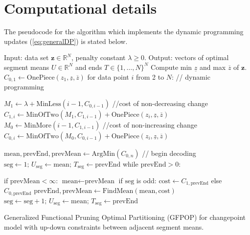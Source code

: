 \documentclass[article]{jss}
\newcommand{\RR}{\mathbb R}
\begin{document}

\section*{Computational details}

The pseudocode for the algorithm which implements the dynamic
programming updates (\ref{eq:generalDP}) is stated below.

\begin{algorithm}
\begin{algorithmic}[1]
\STATE Input: data set $\mathbf z\in\RR^N$, penalty constant $\lambda\geq 0$.
\STATE Output: vectors of optimal segment means $U\in\RR^{N}$ and ends $T\in\{1,\dots,N\}^{N}$
\STATE Compute min $\underline z$ and max $\overline z$ of $\mathbf z$.
\label{line:op-min-max}
\STATE
$ C_{0,1}\gets
 \text{OnePiece}(z_1, \underline z, \overline z)$
\STATE for data point $i$ from 2 to $N$: // dynamic programming
\label{line:for-dp-t}
\begin{ALC@g}
  \STATE $ M_1\gets \lambda + \text{MinLess}(i-1,  C_{0,i-1})$ //cost of non-decreasing change
  \label{line:op-MinLess}
  \STATE $ C_{1,i}\gets \text{MinOfTwo}( M_1,  C_{1,i-1})+\text{OnePiece}(z_i, \underline z, \overline z)$
  \label{line:op-MinOfTwo}
  \STATE $ M_0\gets \text{MinMore}(i-1,  C_{1,i-1})$ //cost of non-increasing change
  \label{line:op-MinMore}
  \STATE $ C_{0,i}\gets \text{MinOfTwo}( M_0,  C_{0,i-1})+\text{OnePiece}(z_i, \underline z, \overline z)$
  \label{line:op-MinOfTwo-under}
\end{ALC@g}
\STATE $\text{mean},\text{prevEnd},\text{prevMean}\gets \text{ArgMin}( C_{0,n})$ // begin decoding
\label{line:op-ArgMin}
\STATE $\text{seg}\gets 1;\, U_{\text{seg}}\gets \text{mean};\, T_{\text{seg}}\gets \text{prevEnd}$
\label{line:op-store-i}
\STATE while $\text{prevEnd} > 0$:
\begin{ALC@g}
  \STATE if $\text{prevMean} < \infty$: $\text{mean}\gets \text{prevMean}$
  \STATE if $\text{seg}$ is odd: $\text{cost}\gets  C_{1,\text{prevEnd}}$ else $ C_{0,\text{prevEnd}}$
  \STATE $\text{prevEnd},\text{prevMean}\gets\text{FindMean}(\text{mean}, \text{cost})$
  \STATE $\text{seg}\gets \text{seg}+1;\, U_{\text{seg}}\gets \text{mean};\, T_{\text{seg}}\gets \text{prevEnd}$
\label{line:op-i+1}
\end{ALC@g}
\caption{\label{algo:GFPOP}Generalized Functional Pruning Optimal
  Partitioning (GFPOP) for changepoint model with up-down constraints
  between adjacent segment means.}
\end{algorithmic}
\end{algorithm}
\end{document}

